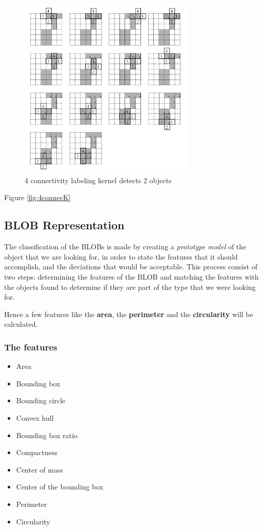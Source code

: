 \begin{figure}[htbp]
\centering
\includegraphics[width=0.75\textwidth]{Pictures/Theory/4connec_kernel.png}
\caption{4 connectivity labeling kernel detects 2 objects}
\label{fig:4connecK}
\end{figure}



Figure \eqref{fig:4connecK}

\subsection{BLOB Representation}
The classification of the BLOBs is made by creating a \textit{prototype model} of the object that we are looking for, in order to state the features that it should accomplish, and the deviations that would be acceptable. This process consist of two steps: determining the features of the BLOB and matching the features with the objects found to determine if they are part of the type that we were looking for.

Hence a few features like the \textbf{area}, the \textbf{perimeter} and the \textbf{circularity} will be calculated.
\subsubsection{The features}
\begin{itemize}
\item Area
\item Bounding box
\item Bounding circle
\item Convex hull
\item Bounding box ratio
\item Compactness
\item Center of mass
\item Center of the bounding box
\item Perimeter
\item Circularity
\end{itemize}

